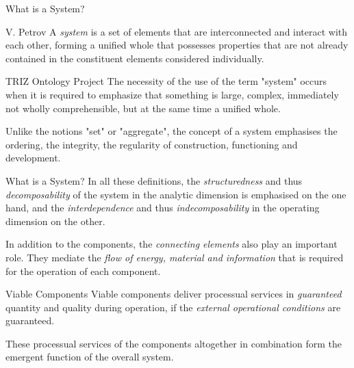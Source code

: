 \documentclass{beamer}
\title{Modelling Sustainable Systems\\ and Semantic Web\\[6pt]
  Organisations as Systems\vskip1em}
\subtitle{Lecture in the Module 10-202-2312\\ for Master Computer Science}
\author{Prof. Dr. Hans-Gert Gräbe\\
\url{http://www.informatik.uni-leipzig.de/~graebe}}
\date{April 2022}
\begin{document}
{
\begin{frame}
  \titlepage
\end{frame}}

\begin{frame}{What is a System?}
  \begin{block}{V. Petrov}
    A \emph{system} is a set of elements that are interconnected and interact
    with each other, forming a unified whole that possesses properties that
    are not already contained in the constituent elements considered
    individually.
  \end{block}

  \begin{block}{TRIZ Ontology Project}
    The necessity of the use of the term "system" occurs when it is required
    to emphasize that something is large, complex, immediately not wholly
    comprehensible, but at the same time a unified whole.

    Unlike the notions "set" or "aggregate", the concept of a system
    emphasises the ordering, the integrity, the regularity of construction,
    functioning and development.
  \end{block}
\end{frame}

\begin{frame}{What is a System?}
In all these definitions, the \emph{structuredness} and thus
\emph{decomposability} of the system in the analytic dimension is emphasised
on the one hand, and the \emph{interdependence} and thus
\emph{indecomposability} in the operating dimension on the other.

In addition to the components, the \emph{connecting elements} also play an
important role.  They mediate the \emph{flow of energy, material and
  information} that is required for the operation of each component.

\begin{block}{Viable Components}
  Viable components deliver processual services in \emph{guaranteed} quantity
  and quality during operation, if the \emph{external operational conditions}
  are guaranteed.
\end{block}

These processual services of the components altogether in combination form the
emergent function of the overall system.
\end{frame}
\end{document}
